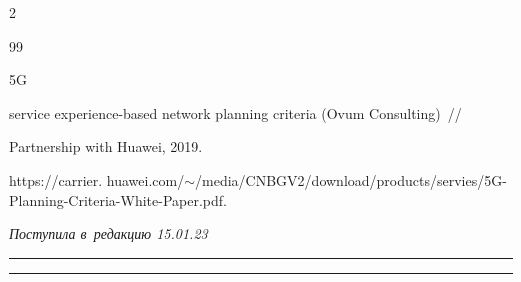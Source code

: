 \begin{multicols}{2}
{{\begin{thebibliography}{99}


 5G 


service experience-based network planning criteria (Ovum Consulting)~// 


Partnership with Huawei, 2019. 


{\sf https://carrier. huawei.com/$\sim$/media/CNBGV2/download/products/\linebreak servies/5G-Planning-Criteria-White-Paper.pdf}.





\end{thebibliography}





 }


 }





\end{multicols}





\vspace*{-6pt}





\hfill{\small\textit{Поступила в~редакцию 15.01.23}}





\vspace*{8pt}




















\hrule





\vspace*{2pt}





\hrule





